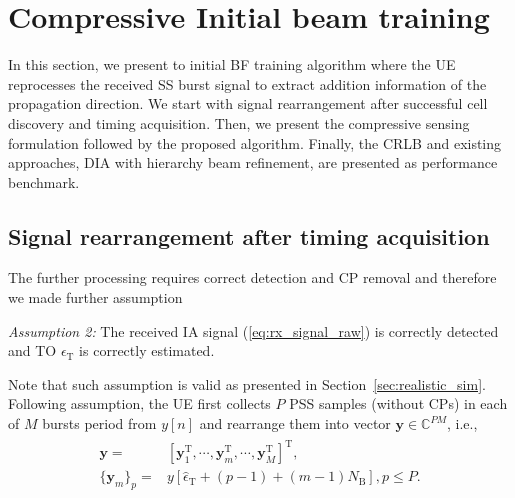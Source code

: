 \documentclass[journal]{IEEEtran}
\newcommand{\transpose}[0]{\text{T}}
\newcommand{\STO}[0]{\epsilon_{\text{T}}}
\newcommand{\Nb}[0]{N_{\text{B}}}
\begin{document}
\section{Compressive Initial beam training}
\label{sec:CS_based_training}
In this section, we present to initial BF training algorithm where the UE reprocesses the received SS burst signal to extract addition information of the propagation direction. We start with signal rearrangement after successful cell discovery and timing acquisition. Then, we present the compressive sensing formulation followed by the proposed algorithm. Finally, the CRLB and existing approaches, DIA with hierarchy beam refinement, are presented as performance benchmark.

\subsection{Signal rearrangement after timing acquisition}
\label{sec:signal_rearrangement}

The further processing requires correct detection and CP removal and therefore we made further assumption 

\textit{Assumption 2:} The received IA signal (\ref{eq:rx_signal_raw}) is correctly detected and TO $\STO$ is correctly estimated. 

Note that such assumption is valid as presented in Section~\ref{sec:realistic_sim}. Following assumption, the UE first collects $P$ PSS samples (without CPs) in each of $M$ bursts period from $y[n]$ and rearrange them into vector $\mathbf{y}\in\mathbb{C}^{PM}$, i.e.,
\begin{align}
\begin{split}
\mathbf{y} = &[\mathbf{y}^{\transpose}_1,\cdots,\mathbf{y}^{\transpose}_m,\cdots,\mathbf{y}^{\transpose}_M]^{\transpose},\\
\{\mathbf{y}_m\}_p = &y[\hat{\epsilon}_{\text{T}}+(p-1)+(m-1)\Nb], p\leq P.
\end{split}
\label{eq:rearrangement}
\end{align}
\end{document}
